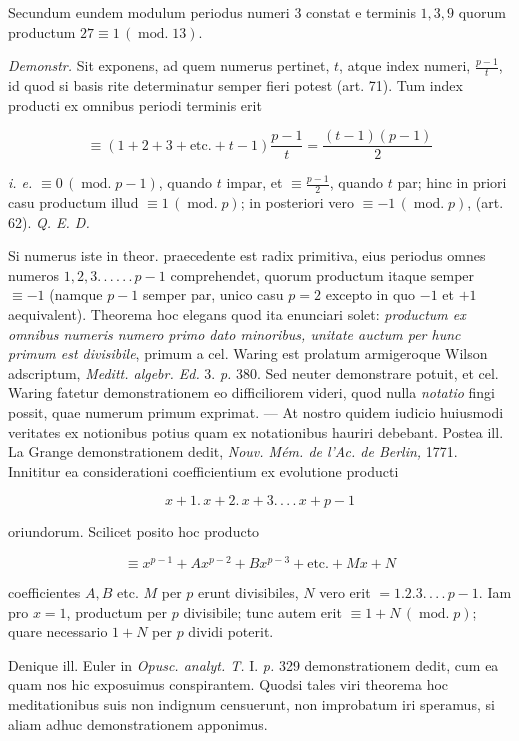Secundum eundem modulum periodus numeri $3$ constat e terminis $1,3,9$ quorum productum $27\equiv1\,(\operatorname{mod.}13)$.

\emph{Demonstr.} Sit exponens, ad quem numerus pertinet, $t$, atque index numeri, $\frac{p-1}{t}$, id quod si basis rite determinatur semper fieri potest (art. 71). Tum index producti ex omnibus periodi terminis erit

\[\equiv(1+2+3+\text{etc.}+t-1)\frac{p-1}{t}=\frac{(t-1)(p-1)}{2}\]

\emph{i. e.} $\equiv0\,(\operatorname{mod.}p-1)$, quando $t$ impar, et $\equiv\frac{p-1}{2}$, quando $t$ par; hinc in priori casu productum illud $\equiv1\,(\operatorname{mod.}p)$; in posteriori vero $\equiv-1\,(\operatorname{mod.}p)$, (art. 62). \emph{Q. E. D.}


Si numerus iste in theor. praecedente est radix primitiva, eius periodus omnes numeros $1,2,3\mathpunct{.\,.\,.\,.\,.\,.}\,p-1$ comprehendet, quorum productum itaque semper $\equiv-1$ (namque $p-1$ semper par, unico casu $p=2$ excepto in quo $-1$ et $+1$ aequivalent). Theorema hoc elegans quod ita enunciari solet: \emph{productum ex omnibus numeris numero primo dato minoribus, unitate auctum per hunc primum est divisibile}, primum a cel. Waring est prolatum armigeroque Wilson adscriptum, \emph{Meditt. algebr. Ed.} 3. \emph{p.} 380. Sed neuter demonstrare potuit, et cel. Waring fatetur demonstrationem eo difficiliorem videri, quod nulla \emph{notatio} fingi possit, quae numerum primum exprimat. --- At nostro quidem iudicio huiusmodi veritates ex notionibus potius quam ex notationibus hauriri debebant. Postea ill. La Grange demonstrationem dedit, \emph{Nouv. M\'em. de l'Ac. de Berlin,} 1771. Innititur ea considerationi coefficientium ex evolutione producti

\[x+1.\,x+2.\,x+3\mathpunct{.\,.\,.\,.}\,x+p-1\]

\noindent oriundorum. Scilicet posito hoc producto

\[\equiv x^{p-1}+Ax^{p-2}+Bx^{p-3}+\text{etc.}+Mx+N\]

\noindent coefficientes $A,B$ etc. $M$ per $p$ erunt divisibiles, $N$ vero erit $=1.2.3\mathpunct{.\,.\,.\,.}\,p-1$. Iam pro $x=1$, productum per $p$ divisibile; tunc autem erit $\equiv1+N\,(\operatorname{mod.}p)$; quare necessario $1+N$ per $p$ dividi poterit.

Denique ill. Euler in \emph{Opusc. analyt. T.} I. \emph{p.} 329 demonstrationem dedit, cum ea quam nos hic exposuimus conspirantem. Quodsi tales viri theorema hoc meditationibus suis non indignum censuerunt, non improbatum iri speramus, si aliam adhuc demonstrationem apponimus.


